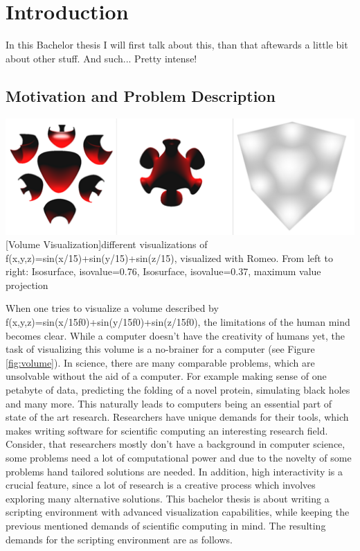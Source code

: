 \section{Introduction}
In this Bachelor thesis I will first talk about this, than that aftewards a little bit about other stuff.
And such... Pretty intense!


\subsection{Motivation and Problem Description}

\vspace{1em}
\begin{minipage}{\linewidth}
    \centering
    \includegraphics[width=0.7\linewidth]{Bilder/surfaces.png}
    [Volume Visualization]{different visualizations of f(x,y,z)=sin(x/15)+sin(y/15)+sin(z/15), visualized with Romeo. From left to right: Isosurface, isovalue=0.76, Isosurface, isovalue=0.37, maximum value projection}
    \label{fig:volume}
\end{minipage}

When one tries to visualize a volume described by f(x,y,z)=sin(x/15f0)+sin(y/15f0)+sin(z/15f0), the limitations of the human mind becomes clear. While a computer doesn't have the creativity of humans yet, the task of visualizing this volume is a no-brainer for a computer (see Figure \ref{fig:volume}).
In science, there are many comparable problems, which are unsolvable without the aid of a computer.
For example making sense of one petabyte of data, predicting the folding of a novel protein, simulating black holes and many more.
This naturally leads to computers being an essential part of state of the art research.
Researchers have unique demands for their tools, which makes writing software for scientific computing an interesting research field.
Consider, that researchers mostly don’t have a background in computer science, some problems need a lot of computational power and due to the novelty of some problems hand tailored solutions are needed. In addition, high interactivity is a crucial feature, since a lot of research is a creative process which involves exploring many alternative solutions.
This bachelor thesis is about writing a scripting environment with advanced visualization capabilities, while keeping the previous mentioned demands of scientific computing in mind.
The resulting demands for the scripting environment are as follows.


